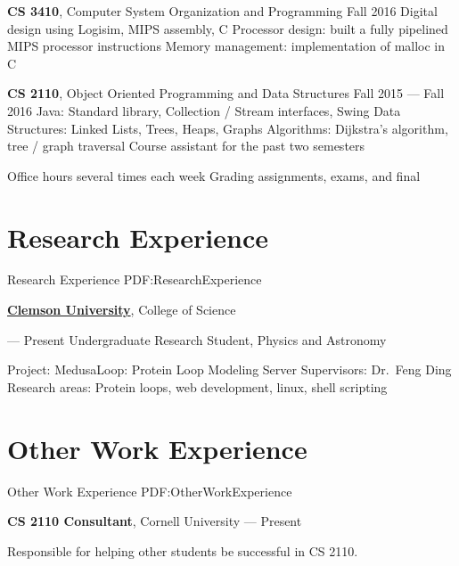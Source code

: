 \documentclass[letterpaper,10pt,oneside]{simpleresumecv}
\begin{document}
\begin{body}
{\textbf{CS 3410}}, Computer System Organization and Programming
\hfill Fall 2016
\BulletItem%
Digital design using Logisim, MIPS assembly, C
\BulletItem%
Processor design: built a fully pipelined MIPS processor
instructions
\BulletItem%
Memory management: implementation of malloc in C
\GapNoBreak%

{\textbf{CS 2110}}, Object Oriented Programming and Data Structures
\hfill Fall 2015 --- Fall 2016
\BulletItem%
Java: Standard library, Collection / Stream interfaces, Swing
\BulletItem%
Data Structures: Linked Lists, Trees, Heaps, Graphs
\BulletItem%
Algorithms: Dijkstra's algorithm, tree / graph traversal
\BulletItem%
Course assistant for the past two semesters
\begin{detail}
\SubBulletItem%
Office hours several times each week
\SubBulletItem%
Grading assignments, exams, and final
\end{detail}

\section%
{Research Experience}
{Research Experience}
{PDF:ResearchExperience}

\href{https://www.clemson.edu}
{\textbf{Clemson University}},
College of Science

\GapNoBreak%
\hfill
{} --- Present
\BulletItem%
Undergraduate Research Student, Physics and Astronomy
\begin{detail}
\SubBulletItem%
Project:
MedusaLoop: Protein Loop Modeling Server
\SubBulletItem%
Supervisors:
Dr.\ Feng Ding
\SubBulletItem%
Research areas:
Protein loops, web development, linux, shell scripting
\end{detail}


\section%
{Other Work\newline
Experience}
{Other Work Experience}
{PDF:OtherWorkExperience}

{\textbf{CS 2110 Consultant}},
Cornell University
\hfill
{} --- Present

\GapNoBreak%
\BulletItem%
Responsible for helping other students be successful in CS 2110.



\end{body}
\end{document}
